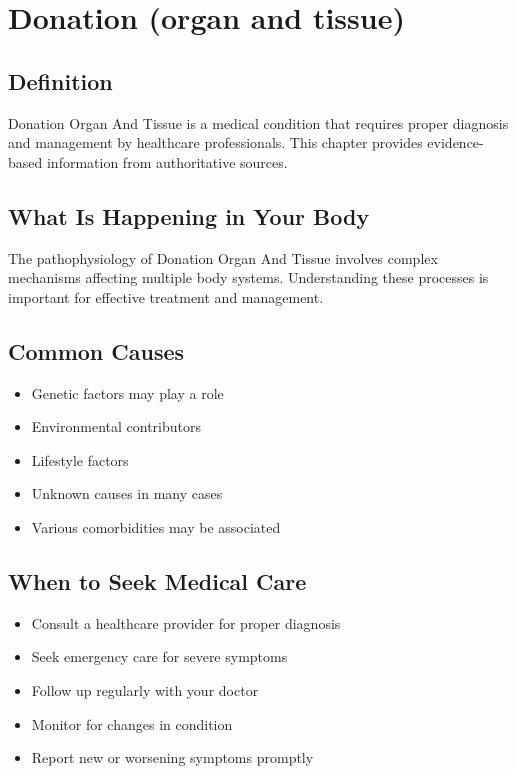 
\chapter{Donation (organ and tissue)}

\section*{Definition}
Donation Organ And Tissue is a medical condition that requires proper diagnosis and management by healthcare professionals. This chapter provides evidence-based information from authoritative sources.

\section*{What Is Happening in Your Body}
The pathophysiology of Donation Organ And Tissue involves complex mechanisms affecting multiple body systems. Understanding these processes is important for effective treatment and management.

\section*{Common Causes}
\begin{itemize}
  \item Genetic factors may play a role
  \item Environmental contributors
  \item Lifestyle factors
  \item Unknown causes in many cases
  \item Various comorbidities may be associated
\end{itemize}

\section*{When to Seek Medical Care}
\begin{itemize}
  \item Consult a healthcare provider for proper diagnosis
  \item Seek emergency care for severe symptoms
  \item Follow up regularly with your doctor
  \item Monitor for changes in condition
  \item Report new or worsening symptoms promptly
\end{itemize}

